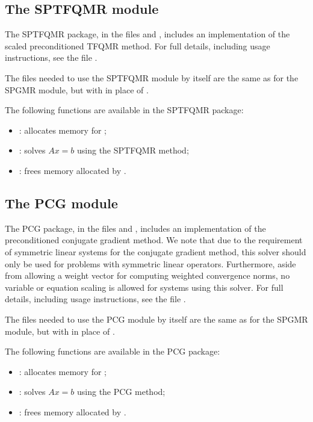 \documentclass[letterpaper,10pt,english]{sphinxmanual}
\begin{document}
\subsection{The SPTFQMR module}
\label{linear_solvers/SPILS:the-sptfqmr-module}
The SPTFQMR package, in the files  and
, includes an implementation of the scaled
preconditioned TFQMR method. For full details, including usage
instructions, see the file .

The files needed to use the SPTFQMR module by itself are the same as
for the SPGMR module, but with  in place of
.

The following functions are available in the SPTFQMR package:
\begin{itemize}
\item {} 
: allocates memory for ;

\item {} 
: solves \(Ax = b\) using the SPTFQMR method;

\item {} 
: frees memory allocated by .

\end{itemize}


\subsection{The PCG module}
\label{linear_solvers/SPILS:the-pcg-module}
The PCG package, in the files  and
, includes an implementation of the
preconditioned conjugate gradient method.  We note that due to the
requirement of symmetric linear systems for the conjugate gradient
method, this solver should only be used for problems with symmetric
linear operators.  Furthermore, aside from allowing a weight vector
for computing weighted convergence norms, no variable or equation
scaling is allowed for systems using this solver.  For full details,
including usage instructions, see the file .

The files needed to use the PCG module by itself are the same as for
the SPGMR module, but with  in place of
.

The following functions are available in the PCG package:
\begin{itemize}
\item {} 
: allocates memory for ;

\item {} 
: solves \(Ax = b\) using the PCG method;

\item {} 
: frees memory allocated by .

\end{itemize}
\end{document}
